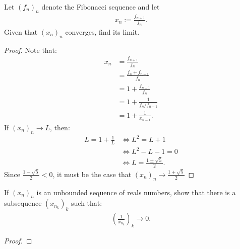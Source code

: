 \documentclass[10pt,twoside,openany]{memoir}
\begin{document}
    \begin{exercise}
        Let $(f_n)_n$ denote the Fibonacci sequence and let
            \begin{equation*}
            \begin{split}
                x_n := \frac{f_{n+1}}{f_n}.
            \end{split}
            \end{equation*}
        Given that $(x_n)_n$ converges, find its limit.
    \end{exercise}
        \begin{proof}
            Note that:
                \begin{equation*}
                \begin{split}
                    x_n 
                    &= \frac{f_{n+1}}{f_n} \\
                    &= \frac{f_{n} + f_{n-1}}{f_n} \\
                    &= 1 + \frac{f_{n-1}}{f_n} \\
                    & = 1 + \frac{1}{{f_n}/f_{n-1}} \\
                    & = 1 + \frac{1}{x_{n-1}}.
                \end{split}
                \end{equation*}
            If $(x_n)_n \rightarrow L$, then:
                \begin{equation*}
                \begin{split}
                    L = 1 + \frac{1}{L}
                    &\iff L^2 = L + 1 \\
                    &\iff L^2 - L - 1 = 0 \\
                    &\iff L = \frac{1 \pm \sqrt{5}}{2}.
                \end{split}
                \end{equation*}
            Since $\frac{1 - \sqrt{5}}{2} < 0$, it must be the case that $(x_n)_n \rightarrow \frac{1 + \sqrt{5}}{2}$
        \end{proof}
    \begin{exercise}
        If $(x_n)_n$ is an unbounded sequence of reals numbers, show that there is a subsequence $(x_{n_k})_k$ such that:
            \begin{equation*}
            \begin{split}
                \left(\frac{1}{x_{n_k}}\right)_k \rightarrow 0.
            \end{split}
            \end{equation*}
    \end{exercise}
        \begin{proof}
            
        \end{proof}
\end{document}
